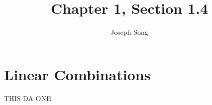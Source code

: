 \documentclass{article}
\title{Chapter 1, Section 1.4}
\author{Joseph Song}
\date{}
\begin{document}
 
\maketitle

\section{Linear Combinations}
THIS DA ONE
 
\end{document}
